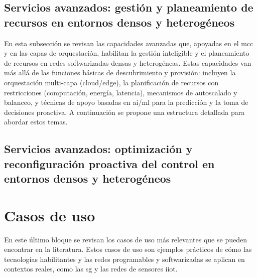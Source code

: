 \subsection{Servicios avanzados: gestión y planeamiento de recursos en entornos densos y heterogéneos}

En esta subsección se revisan las capacidades avanzadas que, apoyadas en el \gls{mcc} y en las capas de orquestación, habilitan la gestión inteligible y el planeamiento de recursos en redes softwarizadas densas y heterogéneas. Estas capacidades van más allá de las funciones básicas de descubrimiento y provisión: incluyen la orquestación multi-capa (cloud/edge), la planificación de recursos con restricciones (computación, energía, latencia), mecanismos de autoscalado y balanceo, y técnicas de apoyo basadas en \gls{ai}/\gls{ml} para la predicción y la toma de decisiones proactiva. A continuación se propone una estructura detallada para abordar estos temas.


\subsection{Servicios avanzados: optimización y reconfiguración proactiva del control en entornos densos y heterogéneos}



\section{Casos de uso}  
\label{sec:casos_de_uso}
En este último bloque se revisan los casos de uso más relevantes que se pueden encontrar en la literatura. Estos casos de uso son ejemplos prácticos de cómo las tecnologías habilitantes y las redes programables y softwarizadas se aplican en contextos reales, como las \gls{sg} y las redes de sensores \gls{iiot}. 